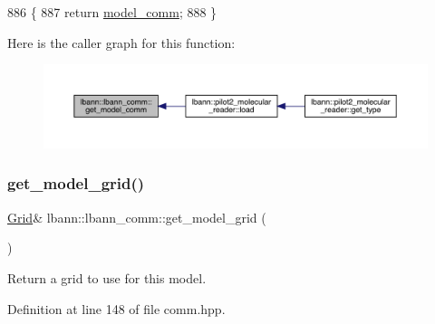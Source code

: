 \begin{DoxyCode}
886                                    \{
887     \textcolor{keywordflow}{return} \hyperlink{classlbann_1_1lbann__comm_a58a75b76bd61ec8a26c1cbbec3dc2f45}{model\_comm};
888   \}
\end{DoxyCode}
Here is the caller graph for this function\+:\nopagebreak
\begin{figure}[H]
\begin{center}
\leavevmode
\includegraphics[width=350pt]{classlbann_1_1lbann__comm_acc06dd4de92e45030d6fbe5984ae58d1_icgraph}
\end{center}
\end{figure}
\mbox{\label{classlbann_1_1lbann__comm_a483bf8a72d44a0e83da45f3d47bd20d4}} 
\subsubsection{\texorpdfstring{get\+\_\+model\+\_\+grid()}{get\_model\_grid()}}
{\footnotesize\ttfamily \hyperlink{base_8hpp_a9951bb1719d534e0401b1f06cad19eab}{Grid}\& lbann\+::lbann\+\_\+comm\+::get\+\_\+model\+\_\+grid (\begin{DoxyParamCaption}{ }\end{DoxyParamCaption})\hspace{0.3cm}{\ttfamily [inline]}}

Return a grid to use for this model. 

Definition at line 148 of file comm.\+hpp.


